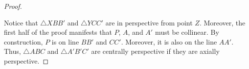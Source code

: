 \documentclass[../main.tex]{subfiles}
\begin{document}
\begin{proof}
\begin{center}
\end{center}

Notice that $\triangle{XBB'}$ and $\triangle{YCC'}$ are in
perspective from point $Z$. Moreover, the first half of the proof
manifests that $P$, $A$, and $A'$ must be collinear. By construction,
$P$ is on line $BB'$ and $CC'$. Moreover, it is also on the line
$AA'$. Thus, $\triangle{ABC}$ and $\triangle{A'B'C'}$ are centrally
perspective if they are axially perspective.
\end{proof}
\end{document}
